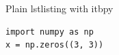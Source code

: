 \documentclass[aspectratio=169,11pt,t]{beamer}
\begin{document}
\begin{frame}[fragile]{Plain lstlisting with itbpy}
\begin{lstlisting}[style=itbpy]
import numpy as np
x = np.zeros((3, 3))
\end{lstlisting}
\end{frame}
\end{document}
